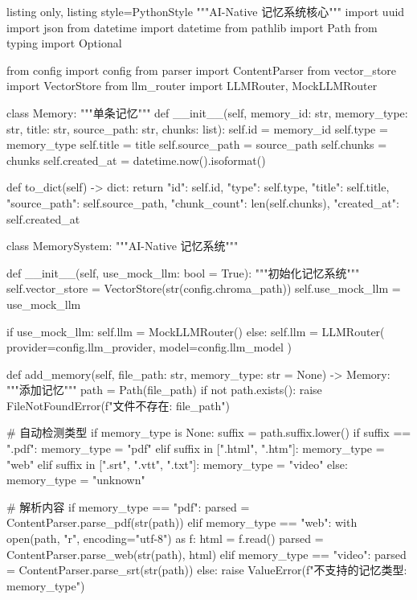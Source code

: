 \documentclass[12pt,a4paper,oneside]{article}
\begin{document}
\begin{tcblisting}{listing only, listing style=PythonStyle}
"""AI-Native 记忆系统核心"""
import uuid
import json
from datetime import datetime
from pathlib import Path
from typing import Optional

from config import config
from parser import ContentParser
from vector_store import VectorStore
from llm_router import LLMRouter, MockLLMRouter

class Memory:
    """单条记忆"""
    def __init__(self, memory_id: str, memory_type: str, title: str,
                 source_path: str, chunks: list):
        self.id = memory_id
        self.type = memory_type
        self.title = title
        self.source_path = source_path
        self.chunks = chunks
        self.created_at = datetime.now().isoformat()

    def to_dict(self) -> dict:
        return {
            "id": self.id, "type": self.type, "title": self.title,
            "source_path": self.source_path, "chunk_count": len(self.chunks),
            "created_at": self.created_at
        }

class MemorySystem:
    """AI-Native 记忆系统"""

    def __init__(self, use_mock_llm: bool = True):
        """初始化记忆系统"""
        self.vector_store = VectorStore(str(config.chroma_path))
        self.use_mock_llm = use_mock_llm

        if use_mock_llm:
            self.llm = MockLLMRouter()
        else:
            self.llm = LLMRouter(
                provider=config.llm_provider,
                model=config.llm_model
            )

    def add_memory(self, file_path: str, memory_type: str = None) -> Memory:
        """添加记忆"""
        path = Path(file_path)
        if not path.exists():
            raise FileNotFoundError(f"文件不存在: {file_path}")

        # 自动检测类型
        if memory_type is None:
            suffix = path.suffix.lower()
            if suffix == ".pdf":
                memory_type = "pdf"
            elif suffix in [".html", ".htm"]:
                memory_type = "web"
            elif suffix in [".srt", ".vtt", ".txt"]:
                memory_type = "video"
            else:
                memory_type = "unknown"

        # 解析内容
        if memory_type == "pdf":
            parsed = ContentParser.parse_pdf(str(path))
        elif memory_type == "web":
            with open(path, "r", encoding="utf-8") as f:
                html = f.read()
            parsed = ContentParser.parse_web(str(path), html)
        elif memory_type == "video":
            parsed = ContentParser.parse_srt(str(path))
        else:
            raise ValueError(f"不支持的记忆类型: {memory_type}")


\end{tcblisting}
\end{document}
